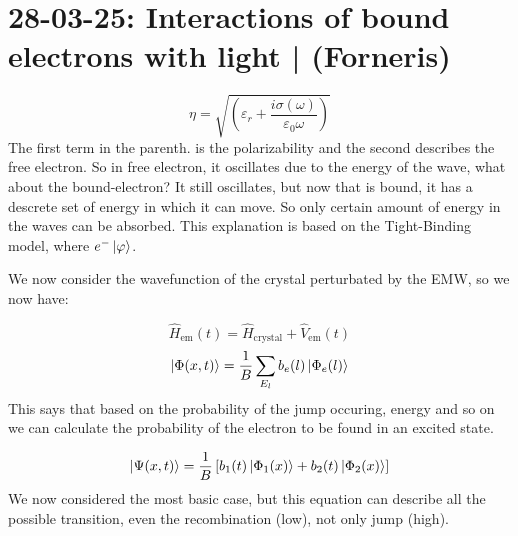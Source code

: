 \section{28-03-25: Interactions of bound electrons with light | (Forneris)}

\begin{equation}
    \eta = \sqrt{\left(\varepsilon_r + \frac{i\sigma(\omega)}{\varepsilon_0\omega}\right)}
\end{equation}
The first term in the parenth. is the polarizability and the second describes the free electron. So in free electron, it oscillates due to the energy of the wave, what about the bound-electron?
It still oscillates, but now that is bound, it has a descrete set of energy in which it can move. So only certain amount of energy in the waves can be absorbed. This explanation is based on the Tight-Binding model, where $e^-\ket{\varphi}$.

We now consider the wavefunction of the crystal perturbated by the EMW, so we now have:

\begin{equation}
    \hat{H}_{\text{em}}(t) =  \hat{H}_{\text{crystal}} + \hat{V}_{\text{em}}(t)
\end{equation}
\begin{equation}
    \ket{\Phi(x,t)} = \frac{1}{B}\sum_{E_l} b_e(l)\ket{\Phi_e(l)}
\end{equation}
This says that based on the probability of the jump occuring, energy and so on we can calculate the probability of the electron to be found in an excited state.

\begin{equation}
    \ket{\Psi(x, t)} = \frac{1}{B} \left[b_1(t) \ket{\Phi_1 (x)} + b_2(t) \ket{\Phi_2 (x)}\right]
\end{equation}
We now considered the most basic case, but this equation can describe all the possible transition, even the recombination (low), not only jump (high).

